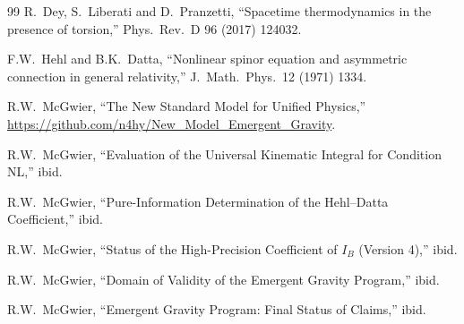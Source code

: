 \documentclass[11pt]{article}
\theoremstyle{definition}
\begin{document}
\begin{thebibliography}{99}
R.~Dey, S.~Liberati and D.~Pranzetti,
``Spacetime thermodynamics in the presence of torsion,''
Phys.\ Rev.\ D 96 (2017) 124032.

F.W.~Hehl and B.K.~Datta,
``Nonlinear spinor equation and asymmetric connection in general relativity,''
J.\ Math.\ Phys.\ 12 (1971) 1334.

R.W.~McGwier,
``The New Standard Model for Unified Physics,''
\url{https://github.com/n4hy/New_Model_Emergent_Gravity}.

R.W.~McGwier,
``Evaluation of the Universal Kinematic Integral for Condition NL,''
ibid.

R.W.~McGwier,
``Pure-Information Determination of the Hehl--Datta Coefficient,''
ibid.

R.W.~McGwier,
``Status of the High-Precision Coefficient of $I_B$ (Version 4),''
ibid.

R.W.~McGwier,
``Domain of Validity of the Emergent Gravity Program,''
ibid.

R.W.~McGwier,
``Emergent Gravity Program: Final Status of Claims,''
ibid.

\end{thebibliography}
\end{document}
